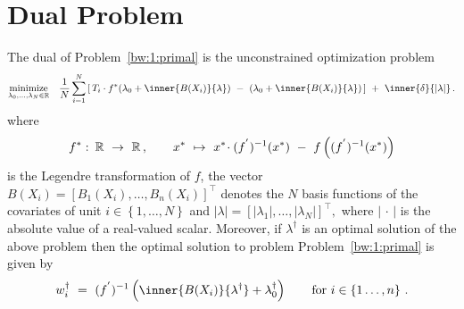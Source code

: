 \section*{Dual Problem}
\begin{ftheorem*}
  The dual of 
  Problem~\ref{bw:1:primal}
  is the unconstrained optimization problem 
\begin{gather*}
  \underset
  {\lambda_0,\ldots,\lambda_{N}\in \R}
  {
    \mathrm{minimize}
  }
  \quad
  \frac{1}{N}
\sum_{i=1} 
  ^N
  \left[ 
    \,
  T_i
  \cdot
  f^*
  \!
  \left( 
\lambda_0
+
\inner
{B(X_i)}
{\lambda}
  \right)
  \ 
-
\ 
  \left( 
\lambda_0
+
\inner
{B(X_i)}
{\lambda}
  \right)
  \,
  \right]
  \ 
+
\ 
\inner
{\delta}
{|\lambda|}
  \,.
\end{gather*}
  where
  \begin{gather*}
  f^*
  \,
  \colon
  \, 
  \R
  \ 
  \to
  \ 
  \R
  \,
  ,
  \qquad 
  x^*
  \ 
  \mapsto
  \ 
    x^*
    \!
    \cdot
    (f^{'})^{-1}(x^*)
  \ 
    -
  \ 
    f
    \left( 
      (f^{'})^{-1}(x^*)
    \right)
  \end{gather*}
  is the Legendre transformation of $f$,
  the vector
  $
    B(X_i)
    =
    \left[ 
      B_1(X_i)
      ,
      \ldots
      ,
      B_n(X_i)
    \right]
    ^\top
  $
  denotes 
  the $N$ basis functions of the covariates 
  of unit $i\in \left\{ 1, \ldots, N \right\}$
  and
  $
    \left| \lambda \right|
    =
    \left[ 
      \left| \lambda_1 \right|
      ,
      \ldots
      ,
      \left| \lambda_N \right|
    \right]
    ^\top
    ,
  $
  where $\left| \,\cdot\, \right|$
  is the absolute value of a real-valued scalar.
  Moreover,
  if $\lambda^\dagger$
  is an optimal solution of the above problem 
  then the optimal solution to problem
  Problem~\ref{bw:1:primal}
  is given by
  \begin{gather*}
    w_i^\dagger
    \ 
    =
    \ 
    (f^{'})^{-1}
    \left( 
      \inner
      {B(X_i)}
      {\lambda^\dagger}
      +
      \lambda_0^\dagger
    \right)
    \qquad
    \text{for}\ 
    i\in \left\{ 1\ldots,n \right\}
    \,.
  \end{gather*}
\end{ftheorem*}
